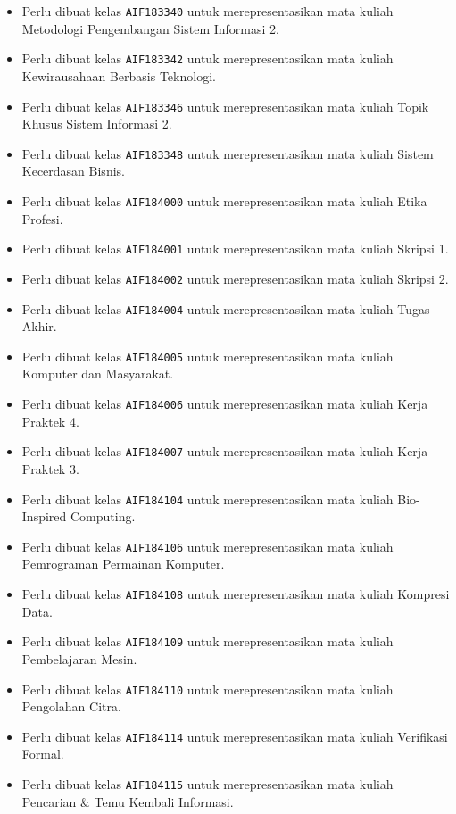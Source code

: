 \begin{enumerate}
\begin{itemize}
		\item Perlu dibuat kelas \texttt{AIF183340} untuk merepresentasikan mata kuliah Metodologi Pengembangan Sistem Informasi 2.
		\item Perlu dibuat kelas \texttt{AIF183342} untuk merepresentasikan mata kuliah Kewirausahaan Berbasis Teknologi.
		\item Perlu dibuat kelas \texttt{AIF183346} untuk merepresentasikan mata kuliah Topik Khusus Sistem Informasi 2.
		\item Perlu dibuat kelas \texttt{AIF183348} untuk merepresentasikan mata kuliah Sistem Kecerdasan Bisnis.
		\item Perlu dibuat kelas \texttt{AIF184000} untuk merepresentasikan mata kuliah Etika Profesi.
		\item Perlu dibuat kelas \texttt{AIF184001} untuk merepresentasikan mata kuliah Skripsi 1.
		\item Perlu dibuat kelas \texttt{AIF184002} untuk merepresentasikan mata kuliah Skripsi 2.
		\item Perlu dibuat kelas \texttt{AIF184004} untuk merepresentasikan mata kuliah Tugas Akhir.
		\item Perlu dibuat kelas \texttt{AIF184005} untuk merepresentasikan mata kuliah Komputer dan Masyarakat.
		\item Perlu dibuat kelas \texttt{AIF184006} untuk merepresentasikan mata kuliah Kerja Praktek 4.
		\item Perlu dibuat kelas \texttt{AIF184007} untuk merepresentasikan mata kuliah Kerja Praktek 3.
		\item Perlu dibuat kelas \texttt{AIF184104} untuk merepresentasikan mata kuliah Bio-Inspired Computing.
		\item Perlu dibuat kelas \texttt{AIF184106} untuk merepresentasikan mata kuliah Pemrograman Permainan Komputer.
		\item Perlu dibuat kelas \texttt{AIF184108} untuk merepresentasikan mata kuliah Kompresi Data.
		\item Perlu dibuat kelas \texttt{AIF184109} untuk merepresentasikan mata kuliah Pembelajaran Mesin.
		\item Perlu dibuat kelas \texttt{AIF184110} untuk merepresentasikan mata kuliah Pengolahan Citra.
		\item Perlu dibuat kelas \texttt{AIF184114} untuk merepresentasikan mata kuliah Verifikasi Formal.
		\item Perlu dibuat kelas \texttt{AIF184115} untuk merepresentasikan mata kuliah Pencarian \& Temu Kembali Informasi.

\end{itemize}
\end{enumerate}
